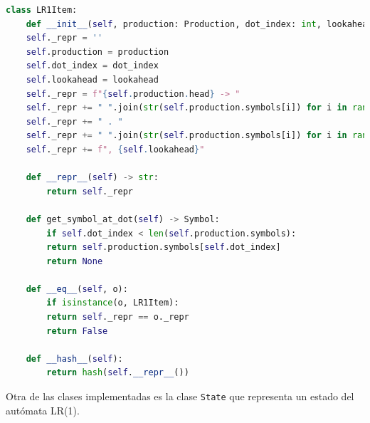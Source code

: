 \documentclass[twoside]{article}
\begin{document}
\begin{lstlisting}[language=Python]
class LR1Item:
	def __init__(self, production: Production, dot_index: int, lookahead: Terminal = None):
	self._repr = ''
	self.production = production
	self.dot_index = dot_index
	self.lookahead = lookahead
	self._repr = f"{self.production.head} -> "
	self._repr += " ".join(str(self.production.symbols[i]) for i in range(self.dot_index))
	self._repr += " . "
	self._repr += " ".join(str(self.production.symbols[i]) for i in range(self.dot_index,len(self.production.symbols)))
	self._repr += f", {self.lookahead}"
	
	def __repr__(self) -> str:
		return self._repr
	
	def get_symbol_at_dot(self) -> Symbol:
		if self.dot_index < len(self.production.symbols):
		return self.production.symbols[self.dot_index]
		return None
	
	def __eq__(self, o):
		if isinstance(o, LR1Item):
		return self._repr == o._repr
		return False
	
	def __hash__(self):
		return hash(self.__repr__())			
\end{lstlisting}
		
		Otra de las clases implementadas es la clase \texttt{State} que representa un estado  del aut\'omata LR(1).
		
		
\end{document}
